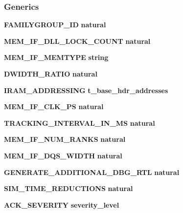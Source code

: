 \subsubsection*{Generics}
 \begin{DoxyCompactItemize}
\item 
{\bf F\+A\+M\+I\+L\+Y\+G\+R\+O\+U\+P\+\_\+\+ID} {\bfseries {\bfseries \textcolor{comment}{natural}\textcolor{vhdlchar}{ }}}
\item 
{\bf M\+E\+M\+\_\+\+I\+F\+\_\+\+D\+L\+L\+\_\+\+L\+O\+C\+K\+\_\+\+C\+O\+U\+NT} {\bfseries {\bfseries \textcolor{comment}{natural}\textcolor{vhdlchar}{ }}}
\item 
{\bf M\+E\+M\+\_\+\+I\+F\+\_\+\+M\+E\+M\+T\+Y\+PE} {\bfseries {\bfseries \textcolor{comment}{string}\textcolor{vhdlchar}{ }}}
\item 
{\bf D\+W\+I\+D\+T\+H\+\_\+\+R\+A\+T\+IO} {\bfseries {\bfseries \textcolor{comment}{natural}\textcolor{vhdlchar}{ }}}
\item 
{\bf I\+R\+A\+M\+\_\+\+A\+D\+D\+R\+E\+S\+S\+I\+NG} {\bfseries {\bfseries {\bfseries {\bf t\+\_\+base\+\_\+hdr\+\_\+addresses}} \textcolor{vhdlchar}{ }}}
\item 
{\bf M\+E\+M\+\_\+\+I\+F\+\_\+\+C\+L\+K\+\_\+\+PS} {\bfseries {\bfseries \textcolor{comment}{natural}\textcolor{vhdlchar}{ }}}
\item 
{\bf T\+R\+A\+C\+K\+I\+N\+G\+\_\+\+I\+N\+T\+E\+R\+V\+A\+L\+\_\+\+I\+N\+\_\+\+MS} {\bfseries {\bfseries \textcolor{comment}{natural}\textcolor{vhdlchar}{ }}}
\item 
{\bf M\+E\+M\+\_\+\+I\+F\+\_\+\+N\+U\+M\+\_\+\+R\+A\+N\+KS} {\bfseries {\bfseries \textcolor{comment}{natural}\textcolor{vhdlchar}{ }}}
\item 
{\bf M\+E\+M\+\_\+\+I\+F\+\_\+\+D\+Q\+S\+\_\+\+W\+I\+D\+TH} {\bfseries {\bfseries \textcolor{comment}{natural}\textcolor{vhdlchar}{ }}}
\item 
{\bf G\+E\+N\+E\+R\+A\+T\+E\+\_\+\+A\+D\+D\+I\+T\+I\+O\+N\+A\+L\+\_\+\+D\+B\+G\+\_\+\+R\+TL} {\bfseries {\bfseries \textcolor{comment}{natural}\textcolor{vhdlchar}{ }}}
\item 
{\bf S\+I\+M\+\_\+\+T\+I\+M\+E\+\_\+\+R\+E\+D\+U\+C\+T\+I\+O\+NS} {\bfseries {\bfseries \textcolor{comment}{natural}\textcolor{vhdlchar}{ }}}
\item 
{\bf A\+C\+K\+\_\+\+S\+E\+V\+E\+R\+I\+TY} {\bfseries {\bfseries \textcolor{vhdlchar}{severity\+\_\+level}\textcolor{vhdlchar}{ }}}
\end{DoxyCompactItemize}
